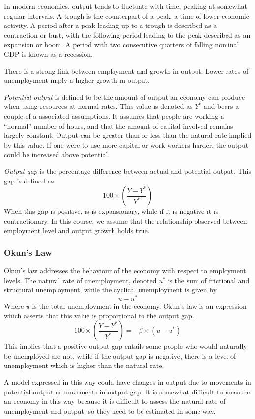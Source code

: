 \documentclass[12pt]{report}
\begin{document}
\begin{flushleft}
In modern economies, output tends to fluctuate with time, peaking at somewhat
regular intervals. A trough is the counterpart of a peak, a time of lower 
economic activity. A period after a peak leading up to a trough is described
as a contraction or bust, with the following period leading to the peak 
described as an expansion or boom. A period with two consecutive quarters of
falling nominal GDP is known as a recession. \par
There is a strong link between employment and growth in output. Lower rates of
unemployment imply a higher growth in output. \par
\textit{Potential output} is defined to be the amount of output an economy can
produce when using resources at normal rates. This value is denoted as \(Y^*\)
and bears a couple of a associated assumptions. It assumes that people are 
working a ``normal'' number of hours, and that the amount of capital involved
remains largely constant. Output can be greater than or less than the natural
rate implied by this value. If one were to use more capital or work workers 
harder, the output could be increased above potential. \par
\textit{Output gap} is the percentage difference between actual and potential
output. This gap is defined as
\[100 \times \left(\frac{Y - Y^*}{Y^*}\right)\]
When this gap is positive, is is expansionary, while if it is negative it is
contractionary. In this course, we assume that the relationship observed 
between employment level and output growth holds true.

\subsubsection*{Okun's Law}

Okun's law addresses the behaviour of the economy with respect to employment
levels. The natural rate of unemployment, denoted \(u^*\) is the sum of 
frictional and structural unemployment, while the cyclical unemployment is
given by
\[u - u^*\]
Where \(u\) is the total unemployment in the economy. Okun's law is an 
expression which asserts that this value is proportional to the output gap.
\[100 \times \left(\frac{Y - Y^*}{Y^*}\right) = -\beta \times (u - u^*)\]
This implies that a positive output gap entails some people who would naturally
be unemployed are not, while if the output gap is negative, there is a level of
unemployment which is higher than the natural rate. \par
A model expressed in this way could have changes in output due to movements in
potential output or movements in output gap. It is somewhat difficult to 
measure an economy in this way because it is difficult to assess the natural 
rate of unemployment and output, so they need to be estimated in some way.


\end{flushleft}
\end{document}
